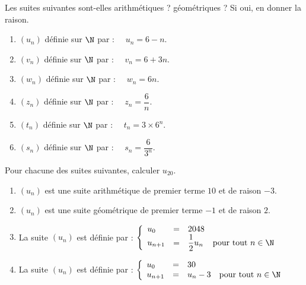 \documentclass[a4paper,11pt,exos]{nsi} %
\begin{document}
Les suites suivantes sont-elles arithmétiques ? géométriques ? Si oui, en donner la raison.
\begin{multicols}{2}
	\begin{enumerate}
		\item 	$(u_n)$ définie sur $\N$ par : $\quad u_n = 6-n$.
		\item 	$(v_n)$ définie sur $\N$ par : $\quad v_n= 6 + 3n$.
		\item 	$(w_n)$ définie sur $\N$ par : $\quad w_n = 6n$.
		\item 	$(z_n)$ définie sur $\N$ par : $\quad z_n=\dfrac{6}{n}$.
		\item 	$(t_n)$ définie sur $\N$ par : $\quad	t_n=3\times 6^n$.
		\item 	$(s_n)$ définie sur $\N$ par : $\quad s_n =\dfrac{6}{3^n}$.
	\end{enumerate}
\end{multicols}




Pour chacune des suites suivantes, calculer $u_{20}$.
\begin{enumerate}
	\item 	$(u_n)$ est une suite arithmétique de premier terme $10$ et de raison $-3$.
	\item	$(u_n)$ est une suite géométrique de premier terme $-1$ et de raison $2$.
	\item	La suite $(u_n)$ est définie par : $\left\{
	\begin{array}{llll}
		u_0 & = & 2048 &\\ 
		u_{n+1} & = & \dfrac{1}{2}u_n&\text{pour tout}\  n\in\N\\
	\end{array}\right. $
	\item	La suite $(u_n)$ est définie par : $\left\{
	\begin{array}{llll}
		u_0 & = & 30 &\\ 
		u_{n+1} & = & u_n-3&\text{pour tout}\  n\in\N\\
	\end{array}\right. $
\end{enumerate}

\end{document}
